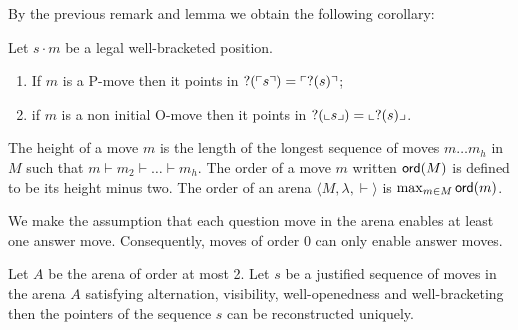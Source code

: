 \vspace{10pt}
By the previous remark and lemma we obtain the following corollary:
\begin{cor}
\label{cor:pendingview}
Let $s \cdot m$ be a legal well-bracketed position.
\begin{enumerate}
\item If $m$ is a P-move then it points in $?(\ulcorner s \urcorner) = \ulcorner ?(s) \urcorner$;
\item if $m$ is a non initial O-move then it points in $?(\llcorner s \lrcorner) = \llcorner ?(s) \lrcorner$.
\end{enumerate}

\end{cor}



The height of a move $m$ is the length of the longest sequence of moves
$m \ldots m_h$ in $M$ such that $m \vdash m_2 \vdash \ldots \vdash m_h$.
The order of a move $m$ written ${\sf ord}(M)$ is defined to be its height minus two.
The order of an arena $\langle M, \lambda, \vdash \rangle$ is $\max_{m \in M} {\sf ord}(m)$.

We make the assumption that each question move in the arena enables at least one answer move. Consequently, moves of order $0$ can only
enable answer moves.

\begin{lem}
Let $A$ be the arena of order at most 2. Let $s$ be a justified sequence of moves in the arena $A$ satisfying
 alternation, visibility, well-openedness and well-bracketing then
the pointers of the sequence $s$ can be reconstructed uniquely.
\end{lem}



